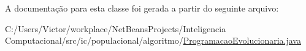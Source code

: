 A documentação para esta classe foi gerada a partir do seguinte arquivo\-:\begin{DoxyCompactItemize}
\item 
C\-:/\-Users/\-Victor/workplace/\-Net\-Beans\-Projects/\-Inteligencia Computacional/src/ic/populacional/algoritmo/\hyperlink{_programacao_evolucionaria_8java}{Programacao\-Evolucionaria.\-java}\end{DoxyCompactItemize}
